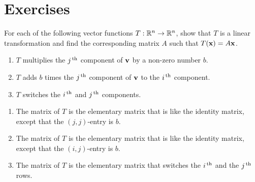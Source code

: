 \section*{Exercises}


\begin{ex}
  For each of the following vector functions $T:\mathbb{R}^{n}\to\mathbb{R}^{n}$, show
  that $T$ is a linear transformation and find the corresponding
  matrix $A$ such that $T(\mbox{\bf x}) = A\mbox{\bf x}$.
  \begin{enumerate}
  \item $T$ multiplies the $j^{\,\rm th}$ component of $\mbox{\bf v}$ by a
    non-zero number $b$.
  \item $T$ adds $b$ times the
    $j^{\,\rm th}$ component of $\mbox{\bf v}$ to the $i^{\,\rm th}$ component. 
  \item $T$ switches the $i^{\,\rm th}$ and $j^{\,\rm th}$ components.
  \end{enumerate}
  \begin{sol}
    \begin{enumerate}
    \item The matrix of $T$ is the elementary matrix that is like the
      identity matrix, except that the $(j,j)$-entry is $b$.
    \item The matrix of $T$ is the elementary matrix that is like the
      identity matrix, except that the $(i,j)$-entry is $b$. 
    \item The matrix of $T$ is the elementary matrix that switches the
      $i^{\,\rm th}$ and the $j^{\,\rm th}$ rows.
    \end{enumerate}
  \end{sol}
\end{ex}

